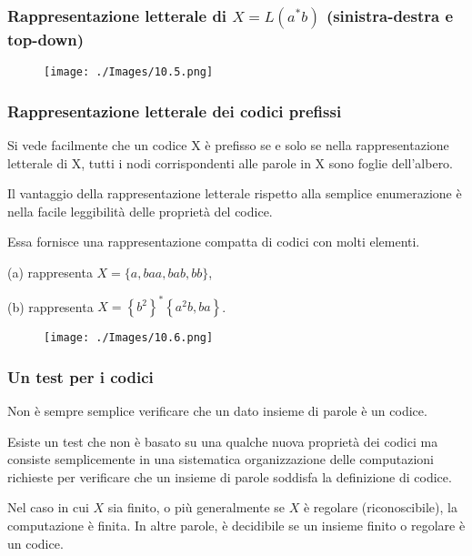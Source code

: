 \subsubsection{Rappresentazione letterale di $X=L\left(a^{*} b\right)$ (sinistra-destra e top-down)}

\begin{figure}[hbpt!]
    \centering
    \texttt{[image: ./Images/10.5.png]}
\end{figure}
\FloatBarrier

\subsubsection{Rappresentazione letterale dei codici prefissi}

Si vede facilmente che un codice X è prefisso se e solo se nella
rappresentazione letterale di X, tutti i nodi corrispondenti alle
parole in X sono foglie dell'albero.

\vspace{5mm}

Il vantaggio della rappresentazione letterale rispetto alla semplice
enumerazione è nella facile leggibilità delle proprietà del codice.

Essa fornisce una rappresentazione compatta di codici con molti
elementi.

(a) rappresenta $X=\{a, b a a, b a b, b b\}$,

(b) rappresenta $X=\left\{b^{2}\right\}^{*}\left\{a^{2} b, b a\right\}$.

\begin{figure}[hbpt!]
    \centering
    \texttt{[image: ./Images/10.6.png]}
\end{figure}
\FloatBarrier

\subsubsection{Un test per i codici}

Non è sempre semplice verificare che un dato insieme di parole è un codice.

Esiste un test che non è basato su una qualche nuova proprietà dei codici ma consiste semplicemente in una sistematica organizzazione delle computazioni richieste per verificare che un insieme di parole soddisfa la definizione di codice.

Nel caso in cui $X$ sia finito, o più generalmente se $X$ è regolare (riconoscibile), la computazione è finita. In altre parole, è decidibile se un insieme finito o regolare è un codice.

